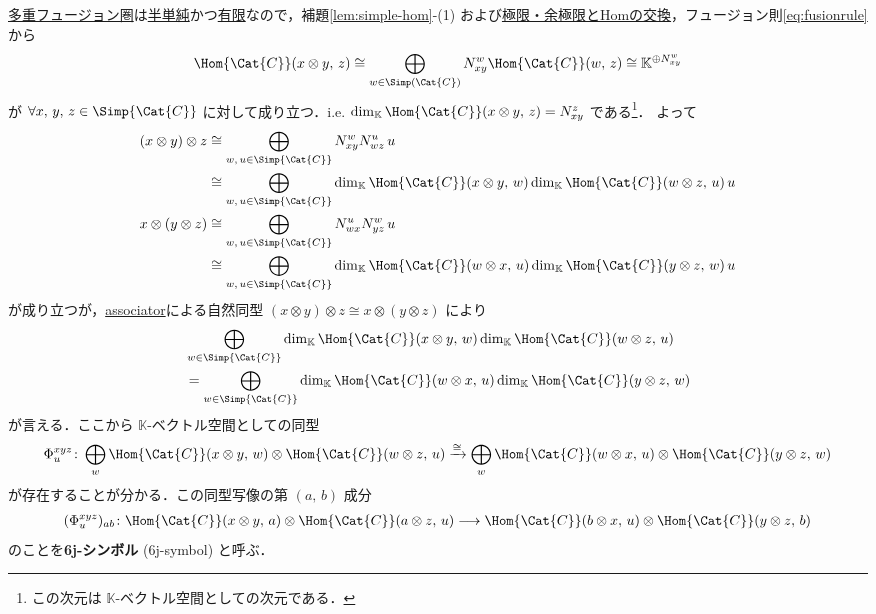 \documentclass[TQFT_main]{subfiles}
\begin{document}
\hyperref[def:tensorfusion-cat]{多重フュージョン圏}は\hyperref[def:semisimple-cat]{半単純}かつ\hyperref[def:finite-abcat]{有限}なので，補題\ref{lem:simple-hom}-(1) および\hyperref[prop:lim-colim-basic]{極限・余極限とHomの交換}，フュージョン則\eqref{eq:fusionrule}から
\begin{align}
    \Hom{\Cat{C}} (x \otimes y,\, z) \cong \bigoplus_{w \in \Simp(\Cat{C})} N^w_{xy} \Hom{\Cat{C}}(w,\, z) \cong \mathbb{K}^{\oplus N^w_{xy}}
\end{align}
が $\forall x,\, y,\, z \in \Simp{\Cat{C}}$ に対して成り立つ．i.e. $\dim_{\mathbb{K}} \Hom{\Cat{C}} (x \otimes y,\, z) = N^z_{xy}$ である\footnote{この次元は $\mathbb{K}$-ベクトル空間としての次元である．}．
よって
\begin{align}
    (x \otimes y) \otimes z &\cong \bigoplus_{w,\, u \in \Simp{\Cat{C}}} N^w_{xy} N^{u}_{wz}\, u \\
    &\cong \bigoplus_{w,\, u \in \Simp{\Cat{C}}} \dim_{\mathbb{K}}\Hom{\Cat{C}} (x \otimes y,\, w) \dim_{\mathbb{K}}\Hom{\Cat{C}} (w \otimes z,\, u)\, u \\
    x \otimes (y \otimes z) &\cong \bigoplus_{w,\, u \in \Simp{\Cat{C}}} N^{u}_{wx} N^w_{yz}\, u \\
    &\cong \bigoplus_{w,\, u \in \Simp{\Cat{C}}}  \dim_{\mathbb{K}}\Hom{\Cat{C}} (w \otimes x,\, u) \dim_{\mathbb{K}}\Hom{\Cat{C}} (y \otimes z,\, w)\, u
\end{align}
が成り立つが，\hyperref[redef:monoidal-category]{associator}による自然同型 $(x \otimes y) \otimes z \cong x \otimes (y \otimes z)$ により
\begin{align}
    &\bigoplus_{w \in \Simp{\Cat{C}}} \dim_{\mathbb{K}}\Hom{\Cat{C}} (x \otimes y,\, w) \dim_{\mathbb{K}}\Hom{\Cat{C}} (w \otimes z,\, u) \\
    &= \bigoplus_{w \in \Simp{\Cat{C}}} \dim_{\mathbb{K}}\Hom{\Cat{C}} (w \otimes x,\, u) \dim_{\mathbb{K}}\Hom{\Cat{C}} (y \otimes z,\, w)
\end{align}
が言える．ここから $\mathbb{K}$-ベクトル空間としての同型
\begin{align}
    \label{eq:6j}
    \Phi^{xyz}_{u} \colon \bigoplus_{w} \Hom{\Cat{C}} (x \otimes y,\, w) \otimes \Hom{\Cat{C}} (w \otimes z,\, u) \xrightarrow{\cong} \bigoplus_{w} \Hom{\Cat{C}} (w \otimes x,\, u) \otimes \Hom{\Cat{C}} (y \otimes z,\, w)
\end{align}
が存在することが分かる．この同型写像の第 $(a,\, b)$ 成分
\begin{align}
    \label{def:6j-symbol}
    (\Phi^{xyz}_u)_{ab} \colon \Hom{\Cat{C}} (x \otimes y,\, a) \otimes \Hom{\Cat{C}} (a \otimes z,\, u) \lto \Hom{\Cat{C}} (b\otimes x,\, u) \otimes \Hom{\Cat{C}} (y \otimes z,\, b)
\end{align}
のことを\textbf{6j-シンボル} (6j-symbol) と呼ぶ．
\end{document}
